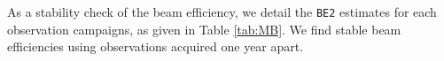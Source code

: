As a stability check of the beam efficiency, we detail the {\tt BE2} estimates
for each observation campaigns, as given in Table
\ref{tab:MB}. %
We find stable beam efficiencies using observations acquired one year apart.


